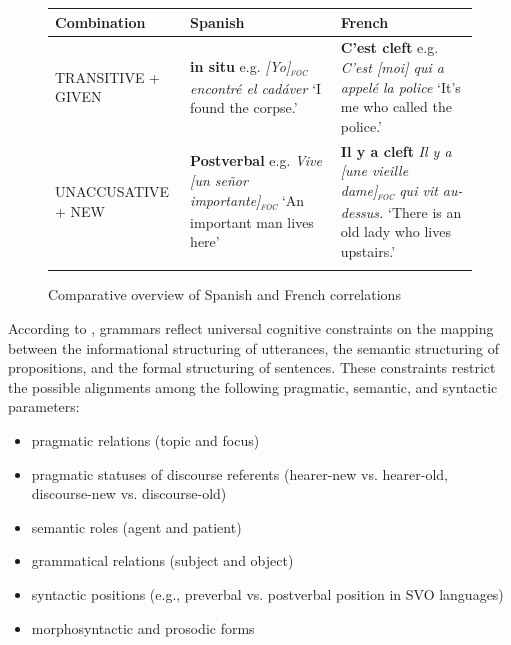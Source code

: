 \begin{figure}
    \small
    \begin{tabularx}{\textwidth}{p{2.5cm}QQ}
      \lsptoprule
      Combination & Spanish & French \\
      \midrule
      TRANSITIVE + GIVEN & \textbf{in situ}\newline
                          e.g. \textit{[Yo]\textsubscript{\textsc{foc}} encontré el cadáver}\newline
                          `I found the corpse.' &
                              \textbf{C'est cleft}\newline
                              e.g. \textit{C'est [moi] qui a appelé la police}\newline
                              `It's me who called the police.'\\
\tablevspace
      UNACCUSATIVE + NEW & \textbf{Postverbal} \newline
                           e.g. \textit{Vive [un señor importante]\textsubscript{\textsc{foc}}}\newline
                          `An important man lives here'&
                              \textbf{Il y a cleft} \newline
                              \textit{Il y a [une vieille dame]\textsubscript{\textsc{foc}} qui vit au-dessus.}\newline
                              `There is an old lady who lives upstairs.'\\
      \lspbottomrule
    \end{tabularx}
    \caption{Comparative overview of Spanish and French correlations}
    \label{fig:5:Plot3}
\end{figure} 


According to \textcite{lambrecht2010constraints}, grammars reflect universal cognitive constraints on the mapping between the informational structuring of utterances, the semantic structuring of propositions, and the formal structuring of sentences. These constraints restrict the possible
alignments among the following pragmatic, semantic, and syntactic parameters:
\begin{itemize}
    \item pragmatic relations (topic and focus)
    \item pragmatic statuses of discourse referents (hearer-new vs. hearer-old, discourse-new vs. discourse-old)
    \item semantic roles (agent and patient)
    \item grammatical relations (subject and object)
    \item syntactic positions (e.g., preverbal vs. postverbal position in SVO languages)
\item morphosyntactic and prosodic forms
\end{itemize}


